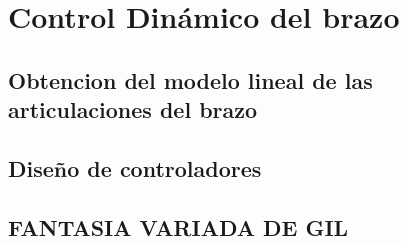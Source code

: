 \section{Control Dinámico del brazo}
	\subsection{Obtencion del modelo lineal de las articulaciones del brazo}
	\subsection{Diseño de controladores}
	\subsection{FANTASIA VARIADA DE GIL}